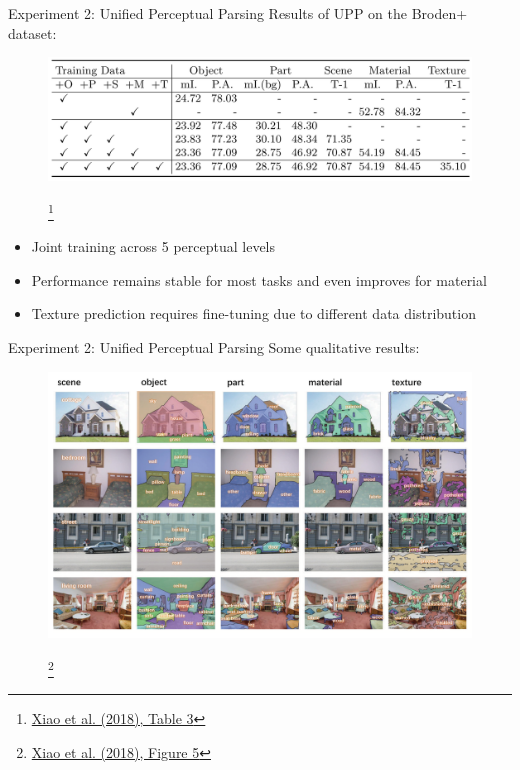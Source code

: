 \documentclass{beamer}
\newcommand\blfootnote[1]{
  \begingroup
  \renewcommand\thefootnote{}\footnote{#1}
  \addtocounter{footnote}{-1}
  \endgroup
}
\begin{document}
\begin{frame}{Experiment 2: Unified Perceptual Parsing}
  Results of UPP on the Broden+ dataset:
  \begin{figure}
    \centering
    \includegraphics[width=\textwidth]{Images/Table3.png}
    \blfootnote{\href{https://doi.org/10.48550/arXiv.1807.10221}{Xiao et al. (2018), Table 3}}
  \end{figure}
  \vspace{-1cm}
  \begin{itemize}
    \item Joint training across 5 perceptual levels
    \item Performance remains stable for most tasks and even improves for material
    \item Texture prediction requires fine-tuning due to different data distribution
  \end{itemize}
\end{frame}

\begin{frame}{Experiment 2: Unified Perceptual Parsing}
  Some qualitative results:
  \vspace{-0.25cm}
  \begin{figure}
    \centering
    \includegraphics[width=\textwidth]{Images/Figure5 Springer.png}
    \blfootnote{\href{https://doi.org/10.1007/978-3-030-01228-1_26}{Xiao et al. (2018), Figure 5}}
  \end{figure}
  \vspace{-1cm}
\end{frame}
\end{document}
